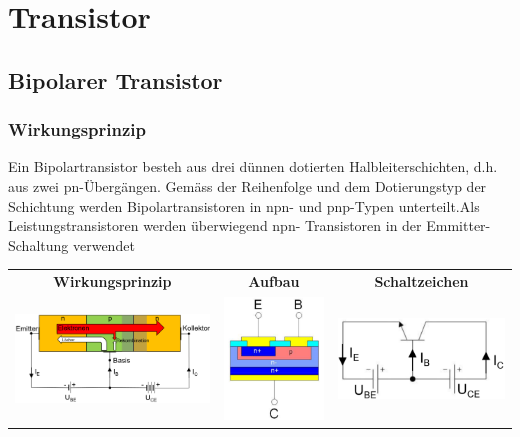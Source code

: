 
\section{Transistor}
\vspace{-0.2cm}
\subsection{Bipolarer Transistor}
\vspace{-0.2cm}
\subsubsection{Wirkungsprinzip}
Ein Bipolartransistor besteh aus drei dünnen dotierten Halbleiterschichten, d.h. aus zwei pn-Übergängen. Gemäss der Reihenfolge und dem Dotierungstyp der Schichtung werden Bipolartransistoren in npn- und pnp-Typen unterteilt.\newline Als Leistungstransistoren werden überwiegend npn- Transistoren in der Emmitter-Schaltung verwendet\newline
\hspace*{2cm}
\begin{tabular}{ccc}
     \textbf{Wirkungsprinzip}&\textbf{Aufbau}&\textbf{Schaltzeichen}\\
     \includegraphics[width=0.35\linewidth]{images/npnTransistor}&
     \includegraphics[width=0.15\linewidth]{images/aufbautransnpn}&
     \includegraphics[width=0.25\linewidth]{images/esbtransnpn} \\
\end{tabular}

